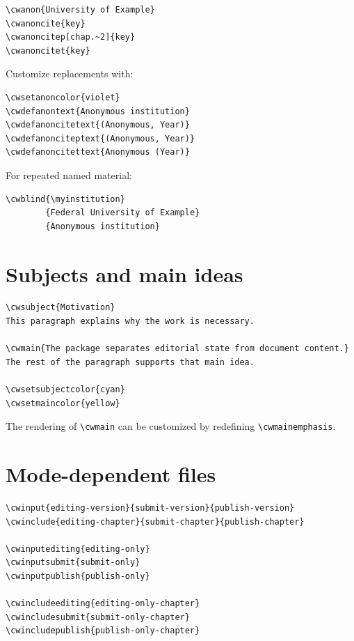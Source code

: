 \documentclass[11pt]{article}
\newcommand{\cmd}[1]{\texttt{\textbackslash#1}}
\begin{document}
\begin{verbatim}
\cwanon{University of Example}
\cwanoncite{key}
\cwanoncitep[chap.~2]{key}
\cwanoncitet{key}
\end{verbatim}

Customize replacements with:

\begin{verbatim}
\cwsetanoncolor{violet}
\cwdefanontext{Anonymous institution}
\cwdefanoncitetext{(Anonymous, Year)}
\cwdefanonciteptext{(Anonymous, Year)}
\cwdefanoncitettext{Anonymous (Year)}
\end{verbatim}

For repeated named material:

\begin{verbatim}
\cwblind{\myinstitution}
        {Federal University of Example}
        {Anonymous institution}
\end{verbatim}

\section*{Subjects and main ideas}

\begin{verbatim}
\cwsubject{Motivation}
This paragraph explains why the work is necessary.

\cwmain{The package separates editorial state from document content.}
The rest of the paragraph supports that main idea.

\cwsetsubjectcolor{cyan}
\cwsetmaincolor{yellow}
\end{verbatim}

The rendering of \cmd{cwmain} can be customized by redefining \cmd{cwmainemphasis}.

\section*{Mode-dependent files}

\begin{verbatim}
\cwinput{editing-version}{submit-version}{publish-version}
\cwinclude{editing-chapter}{submit-chapter}{publish-chapter}

\cwinputediting{editing-only}
\cwinputsubmit{submit-only}
\cwinputpublish{publish-only}

\cwincludeediting{editing-only-chapter}
\cwincludesubmit{submit-only-chapter}
\cwincludepublish{publish-only-chapter}
\end{verbatim}
\end{document}
